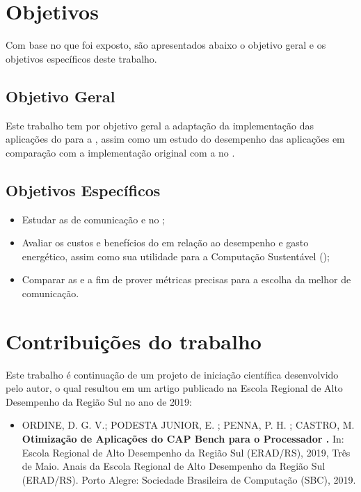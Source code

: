 \section{Objetivos}
\label{sec:objetivos}

Com base no que foi exposto, são apresentados abaixo o objetivo geral e os objetivos específicos deste trabalho.

\subsection{Objetivo Geral}
\label{sec:objetivogeral}

Este trabalho tem por objetivo geral a adaptação da implementação das aplicações do \capb para a \API \ASYNC, assim como um estudo do desempenho das aplicações em comparação com a implementação original com a \API \IPC no \mppa.

\subsection{Objetivos Específicos}
\label{sec:objetivosespecifico}

\begin{itemize}
\item Estudar as \APIs de comunicação \ASYNC e \IPC no \mppa;
\item Avaliar os custos e benefícios do \mppa em relação ao desempenho e gasto energético, assim como sua utilidade para a Computação Sustentável (\greencomputing);
\item Comparar as \APIs \ASYNC e \IPC a fim de prover métricas precisas para a escolha da melhor \API de comunicação.
\end{itemize}

\section{Contribuições do trabalho}

Este trabalho é continuação de um projeto de iniciação científica desenvolvido pelo autor, o qual resultou em um artigo publicado na Escola Regional de Alto Desempenho da Região Sul no ano de 2019:

\begin{itemize}
  \item ORDINE, D. G. V.; PODESTA JUNIOR, E. ; PENNA, P. H. ; CASTRO, M. \textbf{Otimização de Aplicações do CAP Bench para o Processador \mppa.} In: Escola Regional de Alto Desempenho da Região Sul (ERAD/RS), 2019, Três de Maio. Anais da Escola Regional de Alto Desempenho da Região Sul (ERAD/RS). Porto Alegre: Sociedade Brasileira de Computação (SBC), 2019.
\end{itemize}

